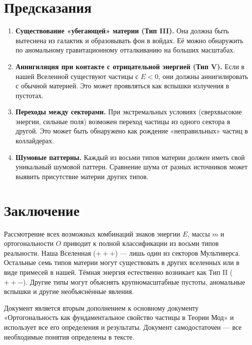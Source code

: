 \documentclass[12pt,a4paper]{article}
\begin{document}
\section{Предсказания}
\begin{enumerate}[label=\arabic*.]
    \item \textbf{Существование «убегающей» материи (Тип III).} Она должна быть вытеснена из галактик и образовывать фон в войдах. Её можно обнаружить по аномальному гравитационному отталкиванию на больших масштабах.
    \item \textbf{Аннигиляция при контакте с отрицательной энергией (Тип V).} Если в нашей Вселенной существуют частицы с $E < 0$, они должны аннигилировать с обычной материей. Это может проявляться как вспышки излучения в пустотах.
    \item \textbf{Переходы между секторами.} При экстремальных условиях (сверхвысокие энергии, сильные поля) возможен переход частицы из одного сектора в другой. Это может быть обнаружено как рождение «неправильных» частиц в коллайдерах.
    \item \textbf{Шумовые паттерны.} Каждый из восьми типов материи должен иметь свой уникальный шумовой паттерн. Сравнение шума от разных источников может выявить присутствие материи других типов.
\end{enumerate}

\section{Заключение}
Рассмотрение всех возможных комбинаций знаков энергии $E$, массы $m$ и ортогональности $O$ приводит к полной классификации из восьми типов реальности. Наша Вселенная ($+ + +$) --- лишь один из секторов Мультиверса. Остальные семь типов материи могут существовать в других вселенных или в виде примесей в нашей. Тёмная энергия естественно возникает как Тип II ($+ + -$). Другие типы могут объяснять крупномасштабные пустоты, аномальные вспышки и другие необъяснённые явления.

Документ является вторым дополнением к основному документу «Ортогональность как фундаментальное свойство частицы в Теории Мод» и использует все его определения и результаты. Документ самодостаточен --- все необходимые понятия определены в тексте.
\end{document}
